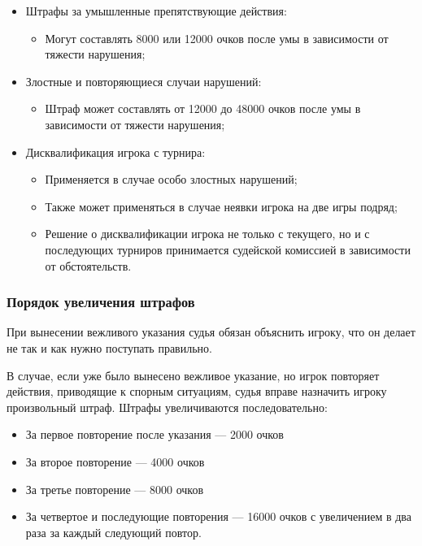 \begin{itemize}
\begin{itemize}
	\end{itemize}
	\item Штрафы за умышленные препятствующие действия:
	\begin{itemize}
		\item Могут составлять 8000 или 12000 очков после умы в зависимости от тяжести нарушения;
	\end{itemize}
	\item Злостные и повторяющиеся случаи нарушений:
	\begin{itemize}
		\item Штраф может составлять от 12000 до 48000 очков после умы в зависимости от тяжести нарушения;
	\end{itemize}
	\item Дисквалификация игрока с турнира:
	\begin{itemize}
		\item Применяется в случае особо злостных нарушений;
		\item Также может применяться в случае неявки игрока на две игры подряд;
		\item Решение о дисквалификации игрока не только с текущего, но и с последующих турниров принимается судейской комиссией в зависимости от обстоятельств.
	\end{itemize}
\end{itemize}

\subsubsection{Порядок увеличения штрафов}

При вынесении вежливого указания судья обязан объяснить игроку, что он делает не так и как нужно поступать правильно.

В случае, если уже было вынесено вежливое указание, но игрок повторяет действия, приводящие к спорным ситуациям, судья вправе назначить игроку произвольный штраф. Штрафы увеличиваются последовательно:

\begin{itemize}
	\item За первое повторение после указания --- 2000 очков
	\item За второе повторение --- 4000 очков
	\item За третье повторение --- 8000 очков
	\item За четвертое и последующие повторения --- 16000 очков с увеличением в два раза за каждый следующий повтор.
\end{itemize}

